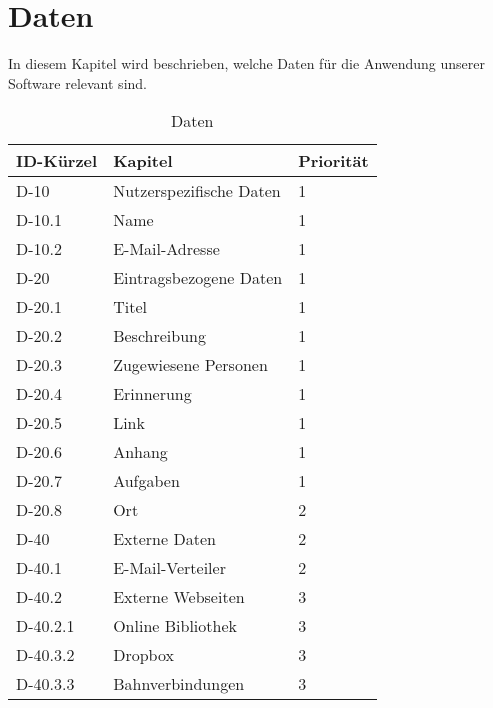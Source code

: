 
\chapter{Daten}

In diesem Kapitel wird beschrieben, welche Daten für die Anwendung unserer Software relevant sind.\\

\begin{table}[H]
    \caption{Daten}
    \label{einleitung:kapitel}
    \begin{tabularx}{\textwidth}{|l|X|l|}
        \toprule
        \textbf{ID-Kürzel} & \textbf{Kapitel} & \textbf{Priorität}\\
        \endhead
        \hline
        D-10 & Nutzerspezifische Daten & 1\\
        D-10.1 & Name &1\\
        D-10.2 & E-Mail-Adresse &1 \\       
        \hline
        D-20 & Eintragsbezogene Daten & 1\\
        D-20.1 & Titel &1\\
        D-20.2 & Beschreibung & 1\\
        D-20.3 & Zugewiesene Personen & 1\\
        D-20.4 & Erinnerung &1\\
        D-20.5 & Link &1\\
        D-20.6 & Anhang &1\\
        D-20.7 & Aufgaben & 1\\
        D-20.8 & Ort &  2\\
        \hline
        D-40 & Externe Daten & 2\\
        D-40.1 & E-Mail-Verteiler & 2\\
        D-40.2 & Externe Webseiten & 3 \\
        D-40.2.1 & Online Bibliothek & 3\\
        D-40.3.2 & Dropbox & 3 \\
        D-40.3.3 & Bahnverbindungen & 3\\
        
        \hline
    \end{tabularx}
\end{table}


